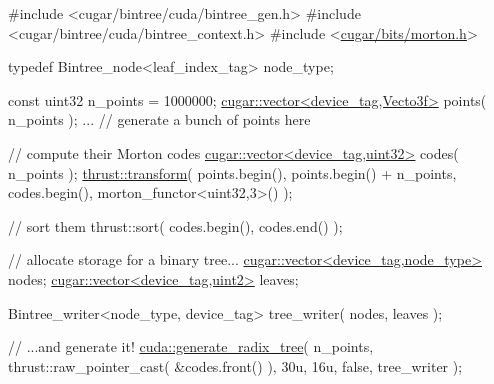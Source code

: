 \begin{DoxyCode}
\textcolor{preprocessor}{#include <cugar/bintree/cuda/bintree\_gen.h>}
\textcolor{preprocessor}{#include <cugar/bintree/cuda/bintree\_context.h>}
\textcolor{preprocessor}{#include <\hyperlink{morton_8h}{cugar/bits/morton.h}>}

\textcolor{keyword}{typedef} Bintree\_node<leaf\_index\_tag> node\_type;

\textcolor{keyword}{const} uint32 n\_points = 1000000;
\hyperlink{structcugar_1_1vector}{cugar::vector<device\_tag,Vecto3f>} points( n\_points );
... \textcolor{comment}{// generate a bunch of points here}

\textcolor{comment}{// compute their Morton codes}
\hyperlink{structcugar_1_1vector}{cugar::vector<device\_tag,uint32>} codes( n\_points );
\hyperlink{group___primitives_gab584ee91ed39f9b1fec5aa0e7a0284a4}{thrust::transform}(
    points.begin(),
    points.begin() + n\_points,
    codes.begin(),
    morton\_functor<uint32,3>() );

\textcolor{comment}{// sort them}
thrust::sort( codes.begin(), codes.end() );

\textcolor{comment}{// allocate storage for a binary tree...}
\hyperlink{structcugar_1_1vector}{cugar::vector<device\_tag,node\_type>} nodes;
\hyperlink{structcugar_1_1vector}{cugar::vector<device\_tag,uint2>}     leaves;

Bintree\_writer<node\_type, device\_tag> tree\_writer( nodes, leaves );

\textcolor{comment}{// ...and generate it!}
\hyperlink{group__radixtree_gafb888a81f085548c89a282181d74649a}{cuda::generate\_radix\_tree}(
    n\_points,
    thrust::raw\_pointer\_cast( &codes.front() ),
    30u,
    16u,
    \textcolor{keyword}{false},
    tree\_writer );
\end{DoxyCode}
 \mbox{\label{group__radixtree_gafb888a81f085548c89a282181d74649a}} 

